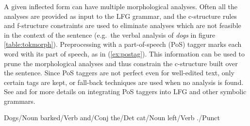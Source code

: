 \documentclass[output=paper,hidelinks]{langscibook}
\begin{document}
A given inflected form can have multiple morphological analyses. Often all the analyses are provided as input to the LFG grammar, and the c-structure rules and f-structure constraints are used to eliminate analyses which are not feasible in the context of the sentence (e.g.\ the verbal analysis of {\em dogs} in figure \ref{table:tokmorph}). Preprocessing with a part-of-speech (PoS) tagger  marks each word with its part of speech, as in (\ref{ex:postag}).   This information can be used to prune  the morphological analyses and thus constrain the c-structure built over the sentence. Since PoS taggers are not perfect even for well-edited  text, only certain tags are kept, or fall-back techniques are used when no analysis is found. See \cite{kaplanking03} and \cite{dalrymple06} for more details on integrating PoS taggers into LFG and other symbolic grammars.


\ea
  \label{ex:postag}  Dogs/Noun barked/Verb and/Conj the/Det cat/Noun left/Verb ./Punct
    
    \z

           
\end{document}
